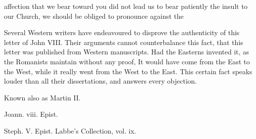 affection that we bear toward you did not lead us to bear patiently the insult to our Church, we should be obliged to pronounce against the

Several Western writers have endeavoured to disprove the authenticity of this letter of John VIII. Their arguments cannot counterbalance this fact, that this letter was published from Western manuscripts. Had the Easterns invented it, as the Romanists maintain without any proof, It would have come from the East to the West, while it really went from the West to the East. This certain fact speaks louder than all their dissertations, and answers every objection.

Known also as Martin II.

Joann. viii. Epist.

Steph. V. Epist. Labbe’s Collection, vol. ix.

